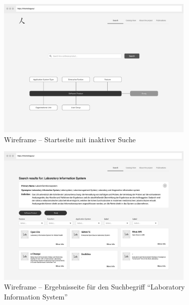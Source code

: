 \begin{figure}
	\centering
    	\includegraphics[width=0.85\textwidth]{Images/Wireframe_Startseite}
   	\caption[Wireframe -- Startseite]{Wireframe -- Startseite mit inaktiver Suche}
   	\label{fig:wireframe_start}
\end{figure}

\clearpage

\begin{figure}
	\centering
    	\includegraphics[width=0.85\textwidth]{Images/Wireframe_Ergebnisseite}
   	\caption[Wireframe -- Ergebnisseite]{Wireframe -- Ergebnisseite für den Suchbegriff \enquote{Laboratory Information System}}
   	\label{fig:wireframe_results}
\end{figure}

\clearpage

